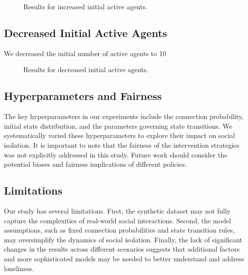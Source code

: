 \documentclass{article} %
\begin{document}
\begin{figure}[t]
    \centering
    \caption{Results for increased initial active agents.}
    \label{fig:increased_initial_active_results}
\end{figure}

\subsection{Decreased Initial Active Agents}
\label{sec:decreased_initial_active}
We decreased the initial number of active agents to 10%

\begin{figure}[t]
    \centering
    \caption{Results for decreased initial active agents.}
    \label{fig:decreased_initial_active_results}
\end{figure}

\subsection{Hyperparameters and Fairness}
\label{sec:hyperparameters_fairness}
The key hyperparameters in our experiments include the connection probability, initial state distribution, and the parameters governing state transitions. We systematically varied these hyperparameters to explore their impact on social isolation. It is important to note that the fairness of the intervention strategies was not explicitly addressed in this study. Future work should consider the potential biases and fairness implications of different policies.

\subsection{Limitations}
\label{sec:limitations}
Our study has several limitations. First, the synthetic dataset may not fully capture the complexities of real-world social interactions. Second, the model assumptions, such as fixed connection probabilities and state transition rules, may oversimplify the dynamics of social isolation. Finally, the lack of significant changes in the results across different scenarios suggests that additional factors and more sophisticated models may be needed to better understand and address loneliness.
\end{document}
